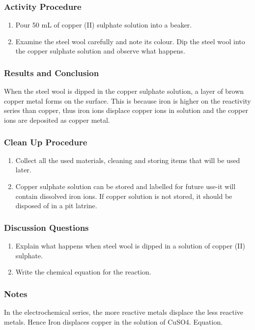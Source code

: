 \subsubsection*{Activity Procedure}
\begin{enumerate}
\item {Pour 50 mL of copper (II) sulphate solution into a beaker.}
\item{Examine the steel wool carefully and note its colour. Dip the steel wool into the copper sulphate solution and observe what happens.}
\end{enumerate}

\subsubsection*{Results and Conclusion}
When the steel wool is dipped in the copper sulphate solution, a layer of brown copper metal forms on the surface. This is because iron is higher on the reactivity series than copper, thus iron ions displace copper ions in solution and the copper ions are deposited as copper metal.

\subsubsection*{Clean Up Procedure}
\begin{enumerate}
\item{Collect all the used materials, cleaning and storing items that will be used later.}
\item{Copper sulphate solution can be stored and labelled for future use-it will contain dissolved iron ions. If copper solution is not stored, it should be disposed of in a pit latrine.}
\end{enumerate}

\subsubsection*{Discussion Questions}
\begin{enumerate}
\item{Explain what happens when steel wool is dipped in a solution of copper (II) sulphate.}
\item{Write the chemical equation for the reaction.}
\end{enumerate}

\subsubsection*{Notes}
In the electrochemical series, the more reactive metals displace the less reactive metals. Hence Iron displaces copper in the solution of CuSO4.
Equation.

